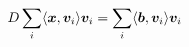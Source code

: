 \documentclass[preview]{standalone}
\begin{document}
\begin{align*}
\vphantom{\sum_i} D \sum_i \langle  \bm x , \bm v_i\rangle \bm v_i  =  \sum_i \langle  \bm b , \bm v_i\rangle \bm v_i
\end{align*}
\end{document}
